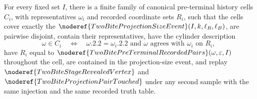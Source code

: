 \begin{helper}
For every fixed set \(I\), there is a finite family of canonical
pre-terminal history cells \(C_i\), with representatives \(\omega_i\) and
recorded coordinate sets \(R_i\), such that the cells cover exactly the
\(\noderef{TwoBiteProjectionSizeEvent}(I,k,\ell_R,\ell_B)\), are pairwise
disjoint, contain their representatives, have the cylinder description
\[
\omega\in C_i
\quad\Longleftrightarrow\quad
\omega.2.2=\omega_i.2.2
\text{ and }\omega\text{ agrees with }\omega_i\text{ on }R_i,
\]
have \(R_i\) equal to
\(\noderef{TwoBitePreTerminalRecordedPairs}(\omega,\varepsilon,I)\) throughout
the cell, are contained in the projection-size event, and replay
\(\noderef{TwoBiteStageRevealedVertex}\) and
\(\noderef{TwoBiteProjectionPairTouched}\) under any second sample with the
same injection and the same recorded truth table.
\end{helper}
